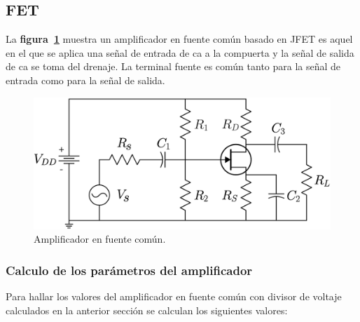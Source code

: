 \subsection{FET}
La \textbf{figura~\ref{figura20}} muestra un amplificador en fuente común basado
en JFET es aquel en el que se aplica una señal de entrada de ca a la compuerta y
la señal de salida de ca se toma del drenaje. La terminal fuente es común tanto
para la señal de entrada como para la señal de salida.

\begin{figure}[!ht]
\centering
\includegraphics[scale=0.30]{diagramas/figura20.eps}
\caption{Amplificador en fuente común.}
\label{figura20}
\end{figure}

\subsubsection{Calculo de los parámetros del amplificador}
Para hallar los valores del amplificador en fuente común con divisor de voltaje
calculados en la anterior sección se calculan los siguientes valores:

